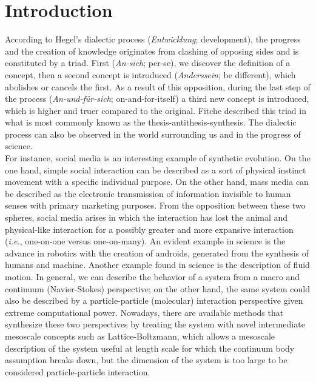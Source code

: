 \justifying
\section{Introduction}
According to Hegel's dialectic process (\textit{Entwicklung}; development), the progress and the creation of knowledge originates from clashing of opposing sides and is constituted by a triad.\cite{hegel1807phenomenology} First (\textit{An-sich}; per-se), we discover the definition of a concept, then a second concept is introduced (\textit{Anderssein}; be different), which abolishes or cancels the first. As a result of this opposition, during the last step of the process (\textit{An-und-f{\"u}r-sich}; on-and-for-itself) a third new concept is introduced, which is higher and truer compared to the original. Fitche described this triad in what is most commonly known as the thesis-antithesis-synthesis. The dialectic process can also be observed in the world surrounding us and in the progress of science.\cite{fichte1993fichte}\\
For instance, social media is an interesting example of synthetic evolution. On the one hand, simple social interaction can be described as a sort of physical instinct movement with a specific individual purpose. On the other hand, mass media can be described as the electronic transmission of information invisible to human senses with primary marketing purposes. From the opposition between these two spheres, social media arises in which the interaction has lost the animal and physical-like interaction for a possibly greater and more expansive interaction (\textit{i.e.}, one-on-one versus one-on-many). An evident example in science is the advance in robotics with the creation of androids, generated from the synthesis of humans and machine. Another example found in science is the description of fluid motion. In general, we can describe the behavior of a system from a macro and continuum (Navier-Stokes) perspective; on the other hand, the same system could also be described by a particle-particle (molecular) interaction perspective given extreme computational power. Nowadays, there are available methods that synthesize these two perspectives by treating the system with novel intermediate mesoscale concepts such as Lattice-Boltzmann, which allows a mesoscale description of the system useful at length scale for which the continuum body assumption breaks down, but the dimension of the system is too large to be considered particle-particle interaction.\cite{amadei2017role}\\
